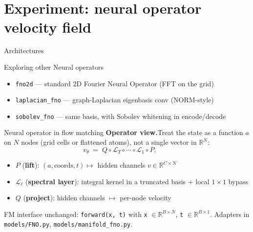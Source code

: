 \documentclass[aspectratio=169,11pt]{beamer}
\begin{document}
\section{Experiment: neural operator velocity field}

\begin{frame}
  \centering
  {\LARGE Architectures}
\end{frame}

\begin{frame}{Exploring other Neural operators}
  \begin{itemize}
    \item \texttt{fno2d} --- standard 2D Fourier Neural Operator (FFT on the grid)
    \item \texttt{laplacian\_fno} --- graph-Laplacian eigenbasis conv (NORM-style)
    \item \texttt{sobolev\_fno} --- same basis, with Sobolev whitening in encode/decode
  \end{itemize}
\end{frame}

\begin{frame}{Neural operator in flow matching}
  \textbf{Operator view.}\quad Treat the state as a function $a$ on $N$ nodes (grid cells or flattened atoms), not a single vector in $\mathbb{R}^N$:
  \[
    v_\theta \;=\; Q \circ \mathcal{L}_T \circ \cdots \circ \mathcal{L}_1 \circ P,
    \qquad
  \]
  \begin{itemize}\setlength{\itemsep}{0.15em}
    \item $P$ (\textbf{lift}): $(a, \text{coords}, t) \mapsto$ hidden channels $v \in \mathbb{R}^{C \times N}$
    \item $\mathcal{L}_\ell$ (\textbf{spectral layer}): integral kernel in a truncated basis + local $1{\times}1$ bypass
    \item $Q$ (\textbf{project}): hidden channels $\mapsto$ per-node velocity
  \end{itemize}

  \vspace{0.35em}
  \small
  FM interface unchanged: \texttt{forward(x, t)} with \texttt{x} $\in \mathbb{R}^{B \times N}$, \texttt{t} $\in \mathbb{R}^{B \times 1}$.
  Adapters in \texttt{models/FNO.py}, \texttt{models/manifold\_fno.py}.
\end{frame}
\end{document}
